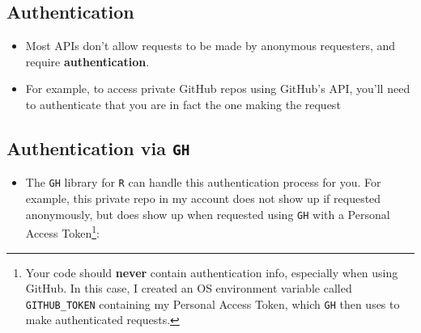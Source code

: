 \documentclass[
  letterpaper,
  DIV=11,
  numbers=noendperiod,
  oneside]{scrreprt}
\newenvironment{Shaded}{\begin{snugshade}}{\end{snugshade}}
\newcommand{\AttributeTok}[1]{\textcolor[rgb]{0.40,0.45,0.13}{#1}}
\newcommand{\CommentTok}[1]{\textcolor[rgb]{0.37,0.37,0.37}{#1}}
\newcommand{\ConstantTok}[1]{\textcolor[rgb]{0.56,0.35,0.01}{#1}}
\newcommand{\ControlFlowTok}[1]{\textcolor[rgb]{0.00,0.23,0.31}{#1}}
\newcommand{\FunctionTok}[1]{\textcolor[rgb]{0.28,0.35,0.67}{#1}}
\newcommand{\NormalTok}[1]{\textcolor[rgb]{0.00,0.23,0.31}{#1}}
\newcommand{\OtherTok}[1]{\textcolor[rgb]{0.00,0.23,0.31}{#1}}
\newcommand{\SpecialCharTok}[1]{\textcolor[rgb]{0.37,0.37,0.37}{#1}}
\newcommand{\StringTok}[1]{\textcolor[rgb]{0.13,0.47,0.30}{#1}}
\providecommand{\tightlist}{%
  \setlength{\itemsep}{0pt}\setlength{\parskip}{0pt}}\usepackage{longtable,booktabs,array}
\begin{document}
\hypertarget{authentication}{%
\subsection{Authentication}\label{authentication}}

\begin{itemize}
\tightlist
\item
  Most APIs don't allow requests to be made by anonymous requesters, and
  require \textbf{authentication}.
\item
  For example, to access private GitHub repos using GitHub's API, you'll
  need to authenticate that you are in fact the one making the request
\end{itemize}

\hypertarget{authentication-via-gh}{%
\subsection{\texorpdfstring{Authentication via
\texttt{GH}}{Authentication via GH}}\label{authentication-via-gh}}

\begin{itemize}
\tightlist
\item
  The \texttt{GH} library for \texttt{R} can handle this authentication
  process for you. For example, this private repo in my account does not
  show up if requested anonymously, but does show up when requested
  using \texttt{GH} with a Personal Access Token\footnote{Your code
    should \textbf{never} contain authentication info, especially when
    using GitHub. In this case, I created an OS environment variable
    called \texttt{GITHUB\_TOKEN} containing my Personal Access Token,
    which \texttt{GH} then uses to make authenticated requests.}:
\end{itemize}

\begin{Shaded}
\end{Shaded}
\end{document}
